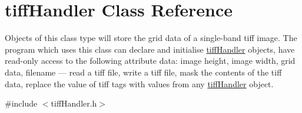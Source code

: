 \hypertarget{classtiffHandler}{}\section{tiff\+Handler Class Reference}
\label{classtiffHandler}


Objects of this class type will store the grid data of a single-\/band tiff image. The program which uses this class can declare and initialise \hyperlink{classtiffHandler}{tiff\+Handler} objects, have read-\/only access to the following attribute data\+: image height, image width, grid data, filename --- read a tiff file, write a tiff file, mask the contents of the tiff data, replace the value of tiff tags with values from any \hyperlink{classtiffHandler}{tiff\+Handler} object.  




{\ttfamily \#include $<$tiff\+Handler.\+h$>$}

